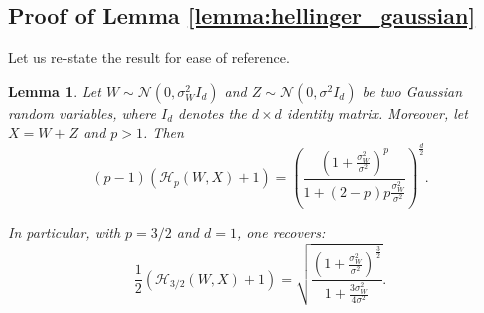 \documentclass[conference]{IEEEtran}
\theoremstyle{plain}
\newtheorem*{lemma*}{Lemma}
\theoremstyle{definition}
\theoremstyle{remark}
\begin{document}
\subsection{Proof of Lemma \ref{lemma:hellinger_gaussian}} \label{appendix:proof_lemma_hellinger}
Let us re-state the result for ease of reference.
\begin{lemma*}
Let $W \sim \mathcal{N}(0, \sigma_W^2I_d)$ and $Z\sim \mathcal{N}(0, \sigma^2I_d)$ be two Gaussian random variables, where $I_d$ denotes the $d\times d$ identity matrix. Moreover, let $X = W+Z$ and $p>1$. Then 
\begin{equation*}
    (p-1)(\mathcal{H}_p(W,X)+1) = \left(\frac{\left(1+\frac{\sigma_W^2}{\sigma^2}\right)^p}{1 + (2-p)p\frac{\sigma_W^2}{\sigma^2}}\right)^\frac{d}{2}.
\end{equation*}

In particular, with $p=3/2$ and $d=1$, one recovers:
\begin{equation*}
    \frac{1}{2}(\mathcal{H}_{3/2}(W, X)+1) =  \sqrt{\frac{\left(1+\frac{\sigma_W^2}{\sigma^2}\right)^\frac32}{1 + \frac{3\sigma_W^2}{4\sigma^2}}}.
\end{equation*}
\end{lemma*}
\end{document}
